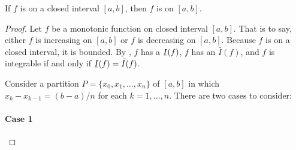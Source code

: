 \documentclass{report}
\newcommand{\ubar}[1]{\text{\b{$#1$}}}
\begin{document}
\begin{theorem}{1.12}

  If $f$ is  on a closed interval $[a, b]$, then $f$
    is  on $[a, b]$.

\end{theorem}

\begin{proof}

  Let $f$ be a monotonic function on closed interval $[a, b]$.
  That is to say, either $f$ is increasing on $[a, b]$ or $f$ is decreasing on
    $[a, b]$.
  Because $f$ is on a closed interval, it is bounded.
  By , $f$ has a 
    $\ubar{I}(f)$, $f$ has an  $\bar{I}(f)$,
    and $f$ is integrable if and only if $\ubar{I}(f) = \bar{I}(f)$.

  Consider a partition $P = \{x_0, x_1, \ldots, x_n\}$ of $[a, b]$ in which
    $x_k - x_{k-1} = (b - a) / n$ for each $k = 1, \ldots, n$.
  There are two cases to consider:

  \paragraph{Case 1}%


\end{proof}
\end{document}
